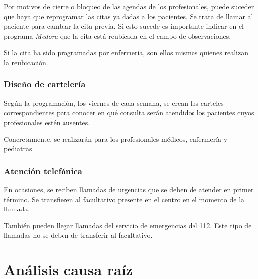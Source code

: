 Por motivos de cierre o bloqueo de las agendas de los profesionales, puede suceder que haya que reprogramar las citas ya dadas a los pacientes.
Se trata de llamar al paciente para cambiar la cita previa. Si esto sucede es importante indicar en el programa \textit{Medora} que la cita está reubicada en el campo de observaciones.

Si la cita ha sido programadas por enfermería, son ellos mismos quienes realizan la reubicación.

\subsubsection{Diseño de cartelería}

Según la programación, los viernes de cada semana, se crean los carteles correspondientes para conocer en qué consulta serán atendidos los pacientes cuyos profesionales estén ausentes.

Concretamente, se realizarán para los profesionales médicos, enfermería y pediatras.

\subsubsection{Atención telefónica}

En ocasiones, se reciben llamadas de urgencias que se deben de atender en primer término. Se transfieren al facultativo presente en el centro en el momento de la llamada.

También pueden llegar llamadas del servicio de emergencias del 112. Este tipo de llamadas no se deben de transferir al facultativo.

\section{Análisis causa raíz}